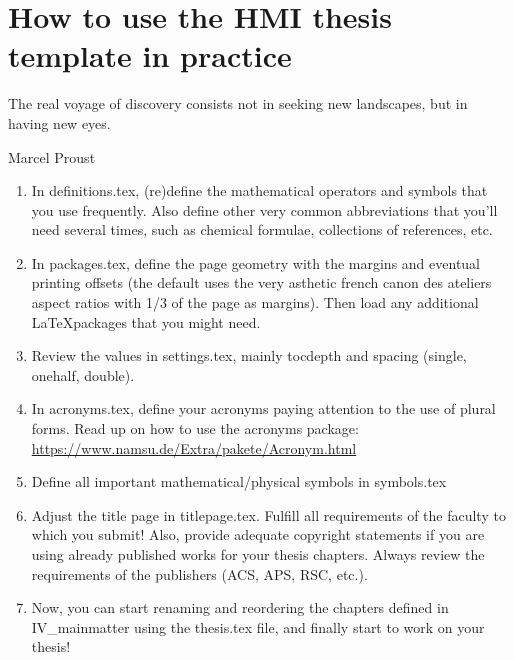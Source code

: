 \chapter[Template introduction]{How to use the HMI thesis template in practice} %
    \label{cha:introduction}
    \onehalfspacing
\epigraph{%
    The real voyage of discovery consists not in seeking new landscapes, but in having new eyes.}
    {Marcel Proust}
    \begin{enumerate}
        \item In definitions.tex, (re)define the mathematical operators and symbols that you use frequently. Also define other very common abbreviations that you'll need several times, such as chemical formulae, collections of references, etc. 
        \item In packages.tex, define the page geometry with the margins and eventual printing offsets (the default uses the very asthetic french canon des ateliers aspect ratios with 1/3 of the page as margins). Then load any additional \LaTeX packages that you might need.
        \item Review the values in settings.tex, mainly tocdepth and spacing (single, onehalf, double).
        \item In acronyms.tex, define your acronyms paying attention to the use of plural forms. Read up on how to use the acronyms package: \url{https://www.namsu.de/Extra/pakete/Acronym.html}
        \item Define all important mathematical/physical symbols in symbols.tex
        \item Adjust the title page in titlepage.tex. Fulfill all requirements of the faculty to which you submit! Also, provide adequate copyright statements if you are using already published works for your thesis chapters. Always review the requirements of the publishers (ACS, APS, RSC, etc.).
        \item Now, you can start renaming and reordering the chapters defined in IV\_mainmatter using the thesis.tex file, and finally start to work on your thesis!
    \end{enumerate}

